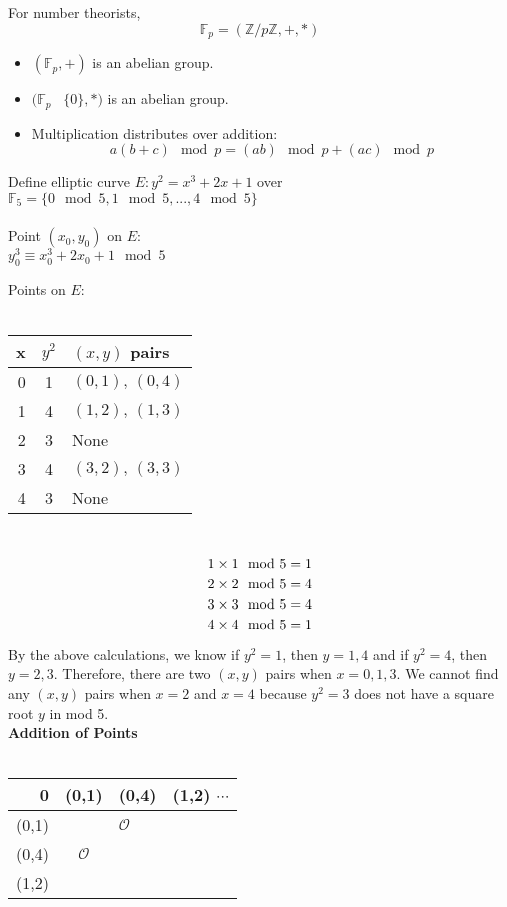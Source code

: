 For number theorists, 
$$\mathbb{F}_{p}=(\mathbb{Z}/p\mathbb{Z}, +, *)$$
\begin{itemize}
\item $(\mathbb{F}_{p}, +)$ is an abelian group.
\item $(\mathbb{F}_{p}$ \ $\{0\}, *)$ is an abelian group.
\item Multiplication distributes over addition:\\
$$a(b+c)\mod{p}=(ab)\mod{p}+(ac)\mod{p}$$
\end{itemize}
\begin{example}

Define elliptic curve $E: y^{2}=x^{3}+2x+1$ over $\mathbb{F}_{5}= \{0\mod{5},1\mod{5},...,4\mod{5}\}$
\\
\\Point $({x}_{0}, {y}_{0})$ on $E$:
\\${y}_{0}^{3} \equiv {x}_{0}^{3}+2{x}_{0}+1\mod{5}$
\end{example}

Points on $E$:
\\
\\\begin{tabular}{r|c|l}
x & $y^{2}$ & $(x,y)$ pairs\\
\hline
0 & 1 & $(0,1), \, (0,4)$ \\
1 & 4 & $(1,2),  \, (1,3) $\\
2 & 3 & None \\
3 & 4 & $(3,2), \,  (3,3)$\\
4 & 3 & None \\
\end{tabular}
\\

$$1 \times 1 \mod{5} = 1\\$$
$$2 \times 2 \mod{5} = 4\\$$
$$3 \times 3 \mod{5} = 4\\$$
$$4 \times 4 \mod{5} = 1\\$$

By the above calculations, we know if $y^2 = 1$, then $y = 1, 4$ and if $y^2 = 4$, then $y = 2, 3$. Therefore, there are two $(x, y)$ pairs when $x = 0, 1, 3$. We cannot find any $(x, y)$ pairs when $x = 2$ and $x = 4$ because $y^2 = 3$ does not have a square root $y$ in mod 5.\\

\textbf{Addition of Points}
\\
\\\begin{tabular}{r|cll}
0 & (0,1) & (0,4) & (1,2) $\cdots$\\
\hline
(0,1) & & $\mathcal{O}$ &\\
(0,4) & $\mathcal{O}$ & & \\
(1,2) & & & \\
\end{tabular}
\\
\\


